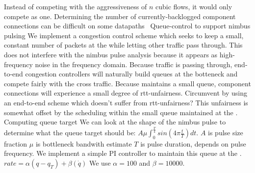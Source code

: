 \begin{outline}
            \4 Instead of competing with the aggressiveness of $n$ cubic flows, it would only compete as one.
            \4 Determining the number of currently-backlogged component connections can be difficult on some datapaths~\cite{heavy-hitters}
\1 Queue-control to support nimbus pulsing
    \2 We implement a congestion control scheme which seeks to keep a small, constant number of packets at the \inbox while letting other traffic pass through.
        \3 This does not interfere with the nimbus pulse analysis because it appears as high-frequency noise in the frequency domain.
        \3 Because traffic is passing through, end-to-end congestion controllers will naturally build queues at the botteneck and compete fairly with the cross traffic.
        \3 Because \inbox maintains a small queue, component connections will experience a small degree of rtt-unfairness.
            \4 Circumvent by using an end-to-end scheme which doesn't suffer from rtt-unfairness?
        \3 This unfairness is somewhat offset by the scheduling within the small queue maintained at the \inbox.
\1 Computing \inbox queue target
    \2 We can look at the shape of the nimbus pulse to determine what the queue target should be: $A \mu \int_0^{\frac{T}{4}} sin(4 \pi \frac{t}{T}) dt$.
        \3 $A$ is pulse size fraction
        \3 $\mu$ is bottleneck bandwith estimate
        \3 $T$ is pulse duration, depends on pulse frequency.
\1 We implement a simple PI controller to maintain this queue at the \inbox.
    \2 $rate = \alpha (q - q_T) + \beta (\dot{q})$
        \3 We use $\alpha = 100$ and $\beta = 10000$.
\end{outline}
